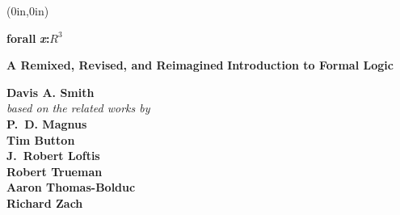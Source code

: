 \documentclass[openany,oneside,11pt]{memoir}
\begin{document}
\begin{textblock*}{0in}(0in,0in)
  \noindent\hfill
  \begin{minipage}[b][\stockheight][s]{.95\stockwidth}
    \begin{center}
      \vspace*{1.5cm}
      \sffamily\fontsize{66pt}{0pt}\selectfont
      \color{white}
      \textbf{forall}%
      \fontsize{66pt}{0pt}\selectfont\rmfamily\textbf{\textit{x}:$R^3$}%
     \end{center}
     \begin{center}
       \vskip0.5cm             
      \color{white}
      \sffamily
      \fontsize{20pt}{22pt}\selectfont
      \textbf{A Remixed, Revised, and Reimagined} 
      \vskip0.5cm
      \textbf{Introduction to Formal Logic}
	\end{center}
\begin{raggedleft}
      \vfill
      \fontsize{11pt}{14pt}\selectfont
      \color{white}
     \textbf{Davis A. Smith}\\
     \textit{based on the related works by}\\
      \textbf{P.~D. Magnus}\\
      \textbf{Tim Button}\\
      \textbf{J.~Robert Loftis}\\
      \textbf{Robert Trueman}\\
      \textbf{Aaron Thomas-Bolduc}\\
      \textbf{Richard Zach}\\
      \vspace{1cm}
      \textbf{\forallxversion}\par
      \vspace{1cm}
    \end{raggedleft}
  \end{minipage}
  \hspace*{1cm}
\end{textblock*}
\ 
\newpage
\color{black}
\setlength{\barlength}{0pt} %


\end{document}
